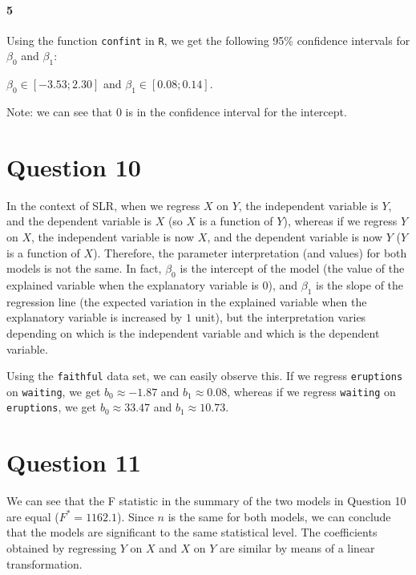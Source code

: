 \documentclass[]{article}
\let\oldparagraph\paragraph
\renewcommand{\paragraph}[1]{\oldparagraph{#1}\mbox{}}
\begin{document}
\paragraph{5}
Using the function \texttt{confint} in \texttt{R}, we get the following 95\% confidence intervals for $\beta_0$ and $\beta_1$:

$\beta_0 \in [-3.53; 2.30]$ and $\beta_1 \in [0.08; 0.14]$.

Note: we can see that $0$ is in the confidence interval for the intercept.

\section*{Question 10}

In the context of SLR, when we regress $X$ on $Y$, the independent variable is $Y$, and the dependent variable is $X$ (so $X$ is a function of $Y$), whereas if we regress $Y$ on $X$, the independent variable is now $X$, and the dependent variable is now $Y$ ($Y$ is a function of $X$). Therefore, the parameter interpretation (and values) for both models is not the same. In fact, $\beta_0$ is the intercept of the model (the value of the explained variable when the explanatory variable is $0$), and $\beta_1$ is the slope of the regression line (the expected variation in the explained variable when the explanatory variable is increased by $1$ unit), but the interpretation varies depending on which is the independent variable and which is the dependent variable.

Using the \texttt{faithful} data set, we can easily observe this. If we regress \texttt{eruptions} on \texttt{waiting}, we get $b_0 \approx -1.87$ and $b_1 \approx 0.08$, whereas if we regress \texttt{waiting} on \texttt{eruptions}, we get $b_0 \approx 33.47$ and $b_1 \approx 10.73$.

\section*{Question 11}

We can see that the F statistic in the summary of the two models in Question 10 are equal ($F^* = 1162.1$). Since $n$ is the same for both models, we can conclude that the models are significant to the same statistical level. The coefficients obtained by regressing $Y$ on $X$ and $X$ on $Y$ are similar by means of a linear transformation.
\end{document}
